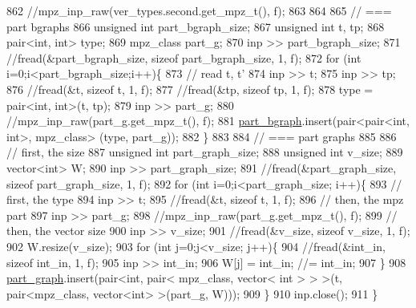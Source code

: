 \begin{DoxyCode}
862   \textcolor{comment}{//mpz\_inp\_raw(ver\_types.second.get\_mpz\_t(), f);}
863 
864 
865   \textcolor{comment}{// === part bgraphs}
866   \textcolor{keywordtype}{unsigned} \textcolor{keywordtype}{int} part\_bgraph\_size;
867   \textcolor{keywordtype}{unsigned} \textcolor{keywordtype}{int} t, tp;
868   pair<int, int> type; 
869   mpz\_class part\_g;
870   inp >> part\_bgraph\_size;
871   \textcolor{comment}{//fread(&part\_bgraph\_size, sizeof part\_bgraph\_size, 1, f);}
872   \textcolor{keywordflow}{for} (\textcolor{keywordtype}{int} i=0;i<part\_bgraph\_size;i++)\{
873     \textcolor{comment}{// read t, t'}
874     inp >> t;
875     inp >> tp;
876     \textcolor{comment}{//fread(&t, sizeof t, 1, f);}
877     \textcolor{comment}{//fread(&tp, sizeof tp, 1, f);}
878     type = pair<int, int>(t, tp);
879     inp >> part\_g;
880     \textcolor{comment}{//mpz\_inp\_raw(part\_g.get\_mpz\_t(), f);}
881     \hyperlink{classmarked__graph__compressed_a7b3267063fba30b45eb21b3ba4e07536}{part\_bgraph}.insert(pair<pair<int, int>, mpz\_class> (type, part\_g));
882   \}
883 
884   \textcolor{comment}{// === part graphs}
885 
886   \textcolor{comment}{// first, the size}
887   \textcolor{keywordtype}{unsigned} \textcolor{keywordtype}{int} part\_graph\_size;
888   \textcolor{keywordtype}{unsigned} \textcolor{keywordtype}{int} v\_size;
889   vector<int> W; 
890   inp >> part\_graph\_size;
891   \textcolor{comment}{//fread(&part\_graph\_size, sizeof part\_graph\_size, 1, f);}
892   \textcolor{keywordflow}{for} (\textcolor{keywordtype}{int} i=0;i<part\_graph\_size; i++)\{
893     \textcolor{comment}{// first, the type}
894     inp >> t; 
895     \textcolor{comment}{//fread(&t, sizeof t, 1, f);}
896     \textcolor{comment}{// then, the mpz part}
897     inp >> part\_g;
898     \textcolor{comment}{//mpz\_inp\_raw(part\_g.get\_mpz\_t(), f);}
899     \textcolor{comment}{// then, the vector size}
900     inp >> v\_size;
901     \textcolor{comment}{//fread(&v\_size, sizeof v\_size, 1, f);}
902     W.resize(v\_size);
903     \textcolor{keywordflow}{for} (\textcolor{keywordtype}{int} j=0;j<v\_size; j++)\{
904       \textcolor{comment}{//fread(&int\_in, sizeof int\_in, 1, f);}
905       inp >> int\_in;
906       W[j] = int\_in; \textcolor{comment}{//= int\_in;}
907     \}
908     \hyperlink{classmarked__graph__compressed_ae179a4737e6eab905c18a94d44ef64b7}{part\_graph}.insert(pair<\textcolor{keywordtype}{int}, pair< mpz\_class, vector< int > > >(t, pair<mpz\_class, vector<int>
       >(part\_g, W)));
909   \}
910   inp.close();
911 \}
\end{DoxyCode}
\mbox{\label{classmarked__graph__compressed_ab9cdb7fc43badd58fb5202f74ffac723}} 
